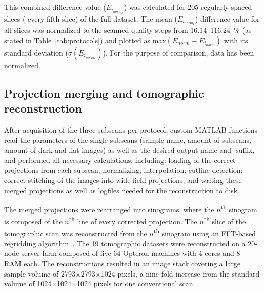 This combined difference value ($E_{i_{norm_{k}}}$) was calculated for 205 regularly spaced slices (%
every fifth slice) of the full dataset. The mean ($\overline{E_{i_{norm_{k}}}}$) difference value for all slices was normalized to the scanned quality-steps from 16.14--\SI{116.24}{\percent} (as stated in Table~\ref{tab:protocols}) and plotted as max$(E_{norm}-E_{i_{norm}})$ with its standard deviation ($\sigma(E_{i_{norm_{k}}})$). For the purpose of comparison, data has been normalized.

\subsection{Projection merging and tomographic reconstruction}
After acquisition of the three subscans per protocol, custom MATLAB functions read the parameters of the single subscans (\eg sample name, amount of subscans, amount of dark and flat images) as well as the desired output-name and -suffix, and performed all necessary calculations, including: loading of the correct projections from each subscan; normalizing; interpolation; cutline detection; correct stitching of the images into wide field projections, and writing these merged projections as well as logfiles needed for the reconstruction to disk.

The merged projections were rearranged into sinograms, where the $n$\textsuperscript{th} sinogram is composed of the $n$\textsuperscript{th} line of every corrected projection. The $n$\textsuperscript{th} slice of the tomographic scan was reconstructed from the $n$\textsuperscript{th} sinogram using an FFT-based regridding algorithm~\cite{Dowd1999}. The 19 tomographic datasets were reconstructed on a 20-node server farm composed of five \SI{64}{\bit} Opteron machines with 4 cores and \SI{8}{\giga\byte} RAM each. The reconstructions resulted in an image stack covering a large sample volume of 2793$\times$2793$\times$1024 pixels, a nine-fold increase from the standard volume of 1024$\times$1024$\times$1024 pixels for one conventional scan.